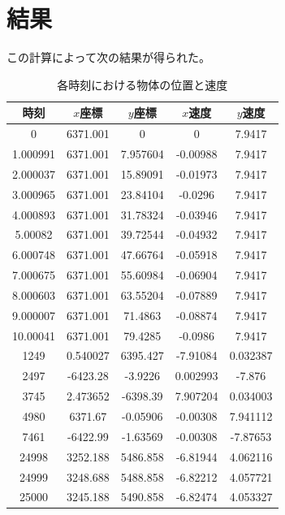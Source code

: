 \documentclass[11pt,b5paper,papersize,dvipdfmx]{jsbook}
\begin{document}
\section{結果}
この計算によって次の結果が得られた。\par
\begin{table}[H]
    \centering
    \caption{各時刻における物体の位置と速度}
        \begin{tabular}{c|cccc}
            \hline
            時刻        &$x$座標     &$y$座標    &$x$速度   &$y$速度\\\hline
            0	        &6371.001	&0	        &0	        &7.9417\\
            1.000991	&6371.001	&7.957604	&-0.00988	&7.9417\\
            2.000037	&6371.001	&15.89091	&-0.01973	&7.9417\\
            3.000965	&6371.001	&23.84104	&-0.0296	&7.9417\\
            4.000893	&6371.001	&31.78324	&-0.03946	&7.9417\\
            5.00082	    &6371.001	&39.72544	&-0.04932	&7.9417\\
            6.000748	&6371.001	&47.66764	&-0.05918	&7.9417\\
            7.000675	&6371.001	&55.60984	&-0.06904	&7.9417\\
            8.000603	&6371.001	&63.55204	&-0.07889	&7.9417\\
            9.000007	&6371.001	&71.4863	&-0.08874	&7.9417\\
            10.00041	&6371.001	&79.4285	&-0.0986	&7.9417\\
            1249	    &0.540027	&6395.427	&-7.91084	&0.032387\\
            2497	    &-6423.28	&-3.9226	&0.002993	&-7.876\\
            3745	    &2.473652	&-6398.39	&7.907204	&0.034003\\
            4980	    &6371.67	&-0.05906	&-0.00308	&7.941112\\
            7461	    &-6422.99	&-1.63569	&-0.00308	&-7.87653\\
            24998	    &3252.188	&5486.858	&-6.81944	&4.062116\\
            24999	    &3248.688	&5488.858	&-6.82212	&4.057721\\
            25000	    &3245.188	&5490.858	&-6.82474	&4.053327\\\hline
        \end{tabular}
        \label{tbl:sj-dataiti}
\end{table}
\end{document}
